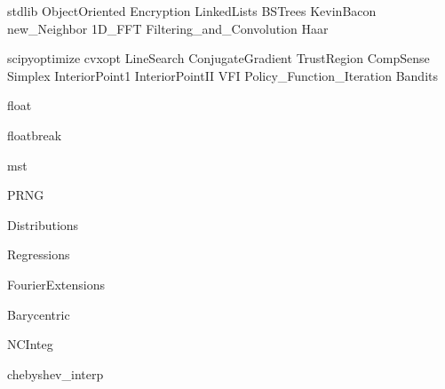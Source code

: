 \documentclass[nociteref]{SIAM-GH-book}
\begin{document}
{stdlib}
{ObjectOriented}
{Encryption}
{LinkedLists}
{BSTrees}
{KevinBacon}
{new_Neighbor}
{1D_FFT}
{Filtering_and_Convolution}
{Haar}


{scipyoptimize}
{cvxopt}
{LineSearch}
{ConjugateGradient}
{TrustRegion}
{CompSense}
{Simplex}
{InteriorPoint1}
{InteriorPointII}
{VFI}
{Policy_Function_Iteration}
{Bandits}



{float}

{floatbreak}

{mst}

{PRNG}

{Distributions}

{Regressions}

{FourierExtensions}

{Barycentric}

{NCInteg}

{chebyshev_interp}
\end{document}
